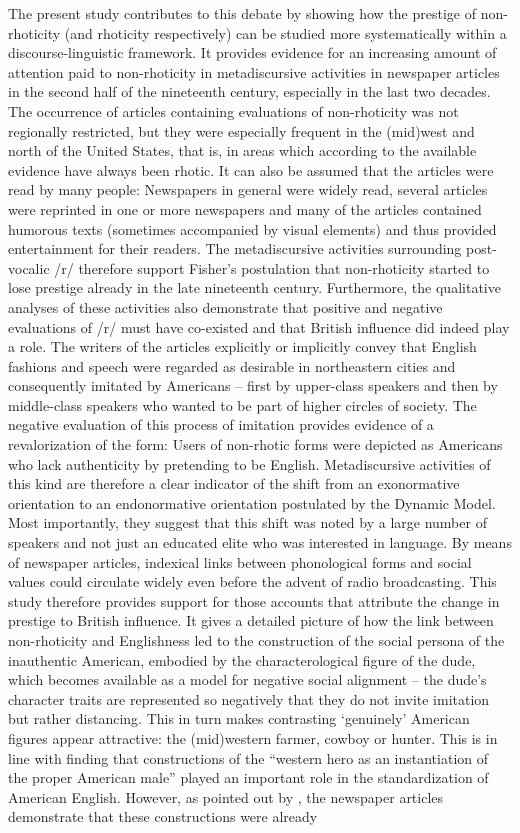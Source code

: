 The present study contributes to this debate by showing how the prestige of non-rhoticity (and rhoticity respectively) can be studied more systematically within a discourse-linguistic framework. It provides evidence for an increasing amount of attention paid to non-rhoticity in metadiscursive activities in newspaper articles in the second half of the nineteenth century, especially in the last two decades. The occurrence of articles containing evaluations of non-rhoticity was not regionally restricted, but they were especially frequent in the (mid)west and north of the United States, that is, in areas which according to the available evidence have always been rhotic. It can also be assumed that the articles were read by many people: Newspapers in general were widely read, several articles were reprinted in one or more newspapers and many of the articles contained humorous texts (sometimes accompanied by visual elements) and thus provided entertainment for their readers. The metadiscursive activities surrounding post-vocalic /r/ therefore support Fisher’s postulation that non-rhoticity started to lose prestige already in the late nineteenth century. Furthermore, the qualitative analyses of these activities also demonstrate that positive and negative evaluations of /r/ must have co-existed and that British influence did indeed play a role. The writers of the articles explicitly or implicitly convey that English fashions and speech were regarded as desirable in northeastern cities and consequently imitated by Americans – first by upper-class speakers and then by middle-class speakers who wanted to be part of higher circles of society. The negative evaluation of this process of imitation provides evidence of a revalorization of the form: Users of non-rhotic forms were depicted as Americans who lack authenticity by pretending to be English. Metadiscursive activities of this kind are therefore a clear indicator of the shift from an exonormative orientation to an endonormative orientation postulated by the Dynamic Model. Most importantly, they suggest that this shift was noted by a large number of speakers and not just an educated elite who was interested in language. By means of newspaper articles, indexical links between phonological forms and social values could circulate widely even before the advent of radio broadcasting. This study therefore provides support for those accounts that attribute the change in prestige to British influence. It gives a detailed picture of how the link between non-rhoticity and Englishness led to the construction of the social persona of the inauthentic American, embodied by the characterological figure of the dude, which becomes available as a model for negative social alignment – the dude’s character traits are represented so negatively that they do not invite imitation but rather distancing. This in turn makes contrasting ‘genuinely’ American figures appear attractive: the (mid)western farmer, cowboy or hunter. This is in line with  finding that constructions of the “western hero as an instantiation of the proper American male” played an important role in the standardization of American English. However, as pointed out by \citet{Minnick2010}, the newspaper articles demonstrate that these constructions were already 